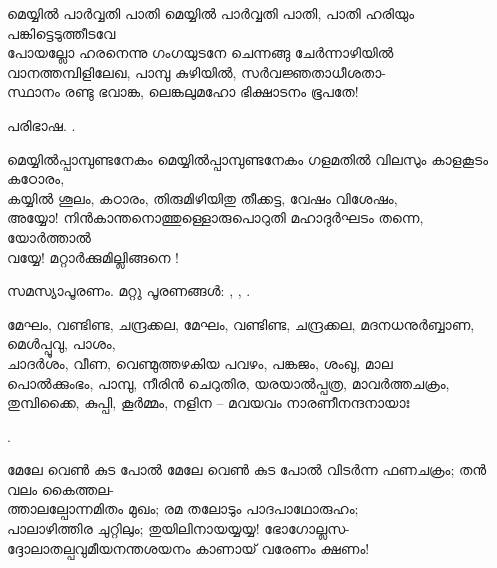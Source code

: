 \begin{enumerate}

\begin{slokam}{\VSv}{\ARRV}{മെയ്യില്‍ പാര്‍വ്വതി പാതി}
മെയ്യില്‍ പാര്‍വ്വതി പാതി, പാതി ഹരിയും പങ്കിട്ടെടുത്തീടവേ\\
പോയല്ലോ ഹരനെന്നു ഗംഗയുടനേ ചെന്നങ്ങു ചേര്‍ന്നാഴിയില്‍\\
വാനത്തമ്പിളിലേഖ, പാമ്പു കുഴിയില്‍, സര്‍വജ്ഞതാധീശതാ-\\
സ്ഥാനം രണ്ടു ഭവാങ്ക, ലെങ്കലുമഹോ ഭിക്ഷാടനം ഭൂപതേ!
\end{slokam}


പരിഭാഷ.  .

\begin{slokam}{\VSr}{\Naduv}{മെയ്യിൽപ്പാമ്പുണ്ടനേകം}
മെയ്യിൽപ്പാമ്പുണ്ടനേകം ഗളമതിൽ വിലസും കാളകൂടം കഠോരം,\\
കയ്യിൽ ശൂലം, കഠാരം, തിരുമിഴിയിതു തീക്കട്ട, വേഷം വിശേഷം,\\
അയ്യോ! നിൻകാന്തനൊത്തുള്ളൊരുപൊറുതി മഹാദുർഘടം തന്നെ, യോർത്താൽ\\
വയ്യേ! മറ്റാർക്കുമില്ലിങ്ങനെ !
\end{slokam}



സമസ്യാപൂരണം. മറ്റു പൂരണങ്ങൾ: , , .



\begin{slokam}{\VSr}{\Unk}{മേഘം, വണ്ടിണ്ട, ചന്ദ്രക്കല,}
 മേഘം, വണ്ടിണ്ട, ചന്ദ്രക്കല, മദനധനുർബ്ബാണ, മെള്‍പ്പൂവു, പാശം,\\
ചാദർശം, വീണ, വെണ്മുത്തഴകിയ പവഴം, പങ്കജം, ശംഖു, മാല\\
പൊൽക്കുംഭം, പാമ്പു, നീരിൻ ചെറുതിര, യരയാൽപ്പത്ര, മാവർത്തചക്രം,\\
തുമ്പിക്കൈ, കുപ്പി, കൂർമ്മം, നളിന -- മവയവം നാരണീനന്ദനായാഃ
\end{slokam}


.

\begin{slokam}{\VSv}{\NKD}{മേലേ വെൺ കുട പോൽ}
മേലേ വെൺ കുട പോൽ വിടർന്ന ഫണചക്രം; തൻ വലം കൈത്തല- \\
ത്താലല്പോന്നമിതം മുഖം; രമ തലോടും പാദപാഥോരുഹം;\\
പാലാഴിത്തിര ചുറ്റിലും; തുയിലിനായയ്യയ്യ! ഭോഗോല്ലസ-\\
ദ്ദോലാതല്പവുമീയനന്തശയനം കാണായ് വരേണം ക്ഷണം! 
\end{slokam}


\end{enumerate}
